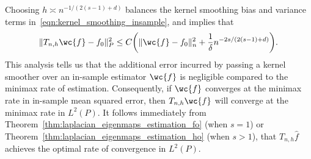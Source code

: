 \documentclass{article}
\newcommand{\1}{\mathbf{1}}
\newcommand{\wh}[1]{\widehat{#1}}
\theoremstyle{alden}
\theoremstyle{aldenthm}
\theoremstyle{definition}
\theoremstyle{remark}
\begin{document}
Choosing $h \asymp n^{-1/(2(s - 1) + d)}$ balances the kernel smoothing bias and variance terms in~\eqref{eqn:kernel_smoothing_insample}, and implies that
\begin{equation}
\label{eqn:kernel_smoothing_insample2}
\|T_{n,h}\wc{f} - f_0\|_P^2 \leq C\biggl(\|\wc{f} - f_0\|_n^2 + \frac{1}{\delta}n^{-2s/(2(s - 1) + d)}\biggr).
\end{equation}
This analysis tells us that the additional error incurred by passing a kernel smoother over an in-sample estimator $\wc{f}$ is negligible compared to the minimax rate of estimation. Consequently, if $\wc{f}$ converges at the minimax rate in in-sample mean squared error, then $T_{n,h}\wc{f}$ will converge at the minimax rate in $L^2(P)$. It follows immediately from Theorem~\ref{thm:laplacian_eigenmaps_estimation_fo} (when $s = 1$) or Theorem~\ref{thm:laplacian_eigenmaps_estimation_ho} (when $s > 1$), that $T_{n,h}\wh{f}$ achieves the optimal rate of convergence in $L^2(P)$.
\end{document}
